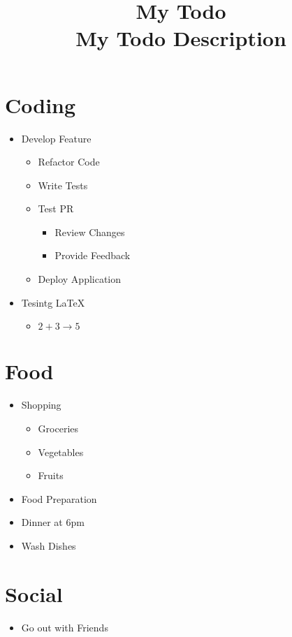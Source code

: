 \documentclass{article}
\title{
  My Todo\\\large{
    My Todo Description
  }
}
\begin{document}
\maketitle


\section{Coding}
\begin{itemize}
  \item Develop Feature
  \begin{itemize}
    \item Refactor Code
    \item Write Tests
    \item Test PR
    \begin{itemize}
      \item Review Changes
      \item Provide Feedback
    \end{itemize}
    \item Deploy Application
  \end{itemize}
  \item Tesintg LaTeX
  \begin{itemize}
    \item $2 + 3 \rightarrow 5$
  \end{itemize}
\end{itemize}
\section{Food}
\begin{itemize}
  \item Shopping
  \begin{itemize}
    \item Groceries
    \item Vegetables
    \item Fruits
  \end{itemize}
  \item Food Preparation
  \item Dinner at 6pm
  \item Wash Dishes
\end{itemize}
\section{Social}
\begin{itemize}
  \item Go out with Friends
\end{itemize}


\end{document}
